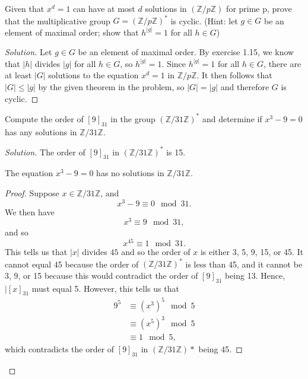 \documentclass[12pt]{article}
\newenvironment{problem}[2][Problem]{\begin{trivlist}
\item[\hskip \labelsep {\bfseries #1}\hskip \labelsep {\bfseries #2.}]}{\end{trivlist}}
\newenvironment{proposition}[1][Proposition]{\begin{trivlist}
\item[\hskip \labelsep {\bfseries #1.}]}{\end{trivlist}}
\newenvironment{solution}
  {\renewcommand\qedsymbol{$\blacksquare$}\begin{proof}[Solution]}
{\end{proof}}
\newenvironment{sproof}{
  \renewcommand\qedsymbol{$\square$}
  \begin{proof}
  }{
  \end{proof}
}
\begin{document}
\begin{problem}{4.11}
  Given that $x^d=1$ can have at most $d$ solutions in $(\mathbb{Z}/p\mathbb{Z})$ for prime p,
    prove that the multiplicative group $G=(\mathbb{Z}/p\mathbb{Z})^*$ is cyclic.
    (Hint: let $g\in G$ be an element of maximal order; show that $h^{|g|}=1$ for all $h\in G$)
\end{problem}
\begin{solution}
    Let $g\in G$ be an element of maximal order.
    By exercise 1.15, we know that $|h|$ divides $|g|$ for all $h\in G$, so $h^{|g|}=1$.
    Since $h^{|g|}=1$ for all $h\in G$, there are at least $|G|$ solutions to the equation
    $x^d=1$ in $\mathbb{Z}/p\mathbb{Z}$. It then follows that $|G|\leq|g|$ by the given theorem in the problem,
    so $|G| = |g|$ and therefore $G$ is cyclic.
\end{solution}

\begin{problem}{4.12}
  Compute the order of $[9]_{31}$ in the group $(\mathbb{Z}/31\mathbb{Z})^*$ 
  and determine if $x^3-9=0$ has any solutions in $\mathbb{Z}/31\mathbb{Z}$.
\end{problem}
\begin{solution}
  The order of $[9]_{31}$ in $(\mathbb{Z}/31\mathbb{Z})^*$ is 15.
  \begin{proposition}
    The equation $x^3-9=0$ has no solutions in $\mathbb{Z}/31\mathbb{Z}$.
  \end{proposition}
  \begin{sproof}
    Suppose $x\in\mathbb{Z}/31\mathbb{Z}$, and $$x^3-9\equiv0\mod 31.$$
    We then have $$x^3\equiv9\mod31,$$ and so
    $$x^{45}\equiv1\mod31.$$
    This tells us that $|x|$ divides $45$ and so the order of $x$ is either 3, 5, 9, 15, or 45.
    It cannot equal 45 because the order of $(\mathbb{Z}/31\mathbb{Z})^*$ is less than 45,
    and it cannot be 3, 9, or 15 because this would contradict the order of $[9]_{31}$ being 13.
    Hence, $|[x]_{31}$ must equal 5.
    However, this tells us that
    \begin{align*}
      9^5 &\equiv (x^3)^5 \mod 5 \\
      &\equiv (x^5)^3 \mod 5 \\
      &\equiv 1 \mod 5,
    \end{align*}
    which contradicts the order of $[9]_{31}$ in $(\mathbb{Z}/31\mathbb{Z})*$ being 45.
  \end{sproof}
\end{solution}
\end{document}
